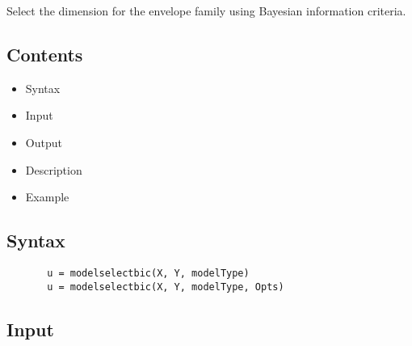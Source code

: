 \documentclass[a4paper,11pt,openany]{memoir}
\begin{document}
\begin{par}
Select the dimension for the envelope family using Bayesian information criteria.
\end{par} \vspace{1em}

\subsection*{Contents}

\begin{itemize}
\setlength{\itemsep}{-1ex}
   \item Syntax
   \item Input
   \item Output
   \item Description
   \item Example
\end{itemize}


\subsection*{Syntax}


\begin{verbatim}       u = modelselectbic(X, Y, modelType)
       u = modelselectbic(X, Y, modelType, Opts)\end{verbatim}
    

\subsection*{Input}
\end{document}

